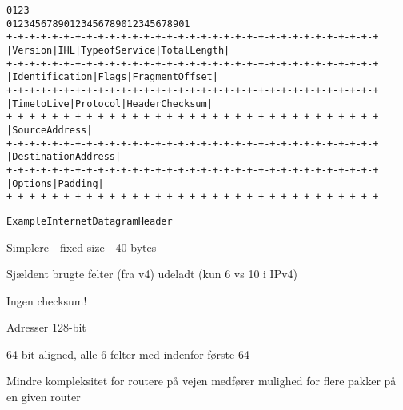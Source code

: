 \documentclass[Screen16to9,17pt]{foils}
\begin{document}

\begin{alltt}
\small
    0                   1                   2                   3
    0 1 2 3 4 5 6 7 8 9 0 1 2 3 4 5 6 7 8 9 0 1 2 3 4 5 6 7 8 9 0 1
   +-+-+-+-+-+-+-+-+-+-+-+-+-+-+-+-+-+-+-+-+-+-+-+-+-+-+-+-+-+-+-+-+
   |Version|  IHL  |Type of Service|          Total Length         |
   +-+-+-+-+-+-+-+-+-+-+-+-+-+-+-+-+-+-+-+-+-+-+-+-+-+-+-+-+-+-+-+-+
   |         Identification        |Flags|      Fragment Offset    |
   +-+-+-+-+-+-+-+-+-+-+-+-+-+-+-+-+-+-+-+-+-+-+-+-+-+-+-+-+-+-+-+-+
   |  Time to Live |    Protocol   |         Header Checksum       |
   +-+-+-+-+-+-+-+-+-+-+-+-+-+-+-+-+-+-+-+-+-+-+-+-+-+-+-+-+-+-+-+-+
   |                       Source Address                          |
   +-+-+-+-+-+-+-+-+-+-+-+-+-+-+-+-+-+-+-+-+-+-+-+-+-+-+-+-+-+-+-+-+
   |                    Destination Address                        |
   +-+-+-+-+-+-+-+-+-+-+-+-+-+-+-+-+-+-+-+-+-+-+-+-+-+-+-+-+-+-+-+-+
   |                    Options                    |    Padding    |
   +-+-+-+-+-+-+-+-+-+-+-+-+-+-+-+-+-+-+-+-+-+-+-+-+-+-+-+-+-+-+-+-+

                    Example Internet Datagram Header
\end{alltt}



\begin{list2}
\item Simplere - fixed size - 40 bytes
\item Sjældent brugte felter (fra v4) udeladt (kun 6 vs 10 i IPv4)
\item Ingen checksum!
\item Adresser 128-bit
\item 64-bit aligned, alle 6 felter med indenfor første 64
\end{list2}

Mindre kompleksitet for routere på vejen medfører
mulighed for flere pakker på en given router

\end{document}
